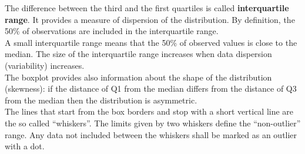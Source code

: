 \begin{frame}
  \begin{small}
    \vspace*{.35cm}
    The difference between the third and the first quartiles is called \textbf{interquartile range}. It provides a measure of dispersion of the distribution. By definition, the 50\% of observations are included in the interquartile range.\\
    \vspace*{.35cm}
    A small interquartile range means that the 50\% of observed values is close to the median. The size of the interquartile range increases when data dispersion (variability) increases.\\
    \vspace*{.35cm}
    The boxplot provides also information about the shape of the distribution (skewness): if the distance of Q1 from the median differs from the distance of Q3 from the median then the distribution is asymmetric.\\
    \vspace*{.35cm}
    The lines that start from the box borders and stop with a short vertical line are the so called ``whiskers''. The limits given by two whiskers define the ``non-outlier'' range. Any data not included between the whiskers shall be marked as an outlier with a dot.\\
  \end{small}
\end{frame}


